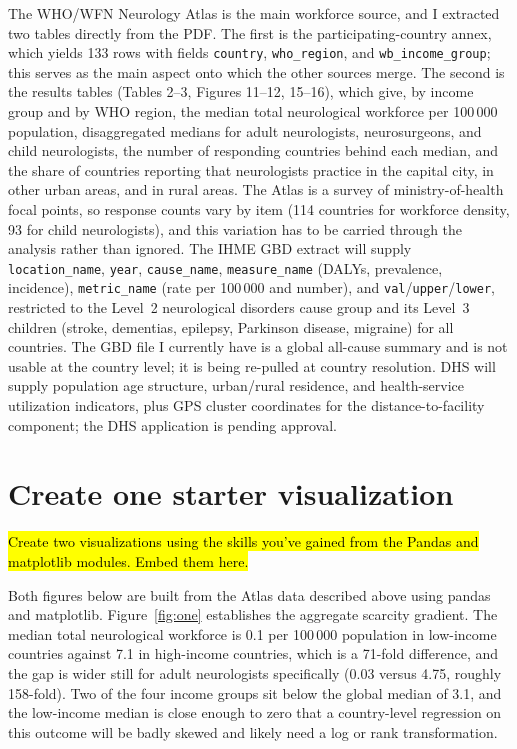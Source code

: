 \documentclass[12pt]{article}
\begin{document}
The WHO/WFN Neurology Atlas is the main workforce source, and I extracted two tables
directly from the PDF. The first is the participating-country annex,
which yields 133 rows with fields \texttt{country}, \texttt{who\_region}, and
\texttt{wb\_income\_group}; this serves as the main aspect onto which the other
sources merge. The second is the results tables (Tables 2--3, Figures 11--12,
15--16), which give, by income group and by WHO region, the median total
neurological workforce per 100\,000 population, disaggregated medians for adult
neurologists, neurosurgeons, and child neurologists, the number of responding
countries behind each median, and the share of countries reporting that
neurologists practice in the capital city, in other urban areas, and in rural
areas. The Atlas is a survey of ministry-of-health focal points, so response
counts vary by item (114 countries for workforce density, 93 for child
neurologists), and this variation has to be carried through the analysis rather
than ignored. The IHME GBD extract will supply \texttt{location\_name},
\texttt{year}, \texttt{cause\_name}, \texttt{measure\_name} (DALYs, prevalence,
incidence), \texttt{metric\_name} (rate per 100\,000 and number), and
\texttt{val}/\texttt{upper}/\texttt{lower}, restricted to the Level~2
neurological disorders cause group and its Level~3 children (stroke, dementias,
epilepsy, Parkinson disease, migraine) for all countries. The GBD file I currently have
is a global all-cause summary and is not usable at the country level; it
is being re-pulled at country resolution. DHS will supply population age
structure, urban/rural residence, and health-service utilization indicators, plus
GPS cluster coordinates for the distance-to-facility component; the DHS
application is pending approval.

\section{Create one starter visualization}

\hl{Create two visualizations using the skills you've gained from the Pandas and matplotlib modules. Embed them here.}

Both figures below are built from the Atlas data described above using pandas and
matplotlib. Figure~\ref{fig:one} establishes the aggregate scarcity gradient.
The median total neurological workforce is 0.1 per 100\,000 population in
low-income countries against 7.1 in high-income countries, which is a 71-fold difference,
and the gap is wider still for adult neurologists specifically (0.03 versus 4.75,
roughly 158-fold). Two of the four income groups sit below the global median of
3.1, and the low-income median is close enough to zero that a country-level
regression on this outcome will be badly skewed and likely need a log
or rank transformation.
\newpage
\end{document}
